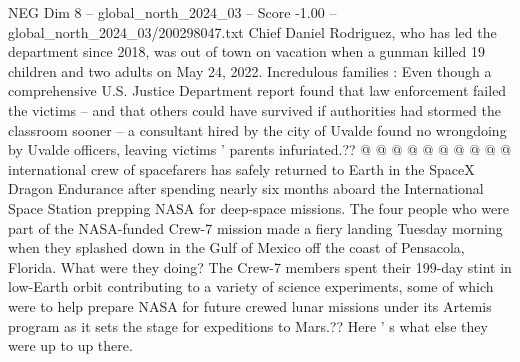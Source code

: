 \begin{textsample}{NEG Dim 8 – global\_north\_2024\_03 – Score -1.00 – global\_north\_2024\_03/200298047.txt}
Chief Daniel Rodriguez, who has led the department since 2018, was out of town on vacation when a gunman killed 19 children and two adults on May 24, 2022.
Incredulous families : Even though a comprehensive U.S.
Justice Department report found that law enforcement failed the victims -- and that others could have survived if authorities had stormed the classroom sooner -- a consultant hired by the city of Uvalde found no wrongdoing by Uvalde officers, leaving victims ' parents infuriated.?? @ @ @ @ @ @ @ @ @ @ international crew of spacefarers has safely returned to Earth in the SpaceX Dragon Endurance after spending nearly six months aboard the International Space Station prepping NASA for deep-space missions.
The four people who were part of the NASA-funded Crew-7 mission made a fiery landing Tuesday morning when they splashed down in the Gulf of Mexico off the coast of Pensacola, Florida.
What were they doing?
The Crew-7 members spent their 199-day stint in low-Earth orbit contributing to a variety of science experiments, some of which were to help prepare NASA for future crewed lunar missions under its Artemis program as it sets the stage for expeditions to Mars.??
Here ' s what else they were up to up there.

\end{textsample}
